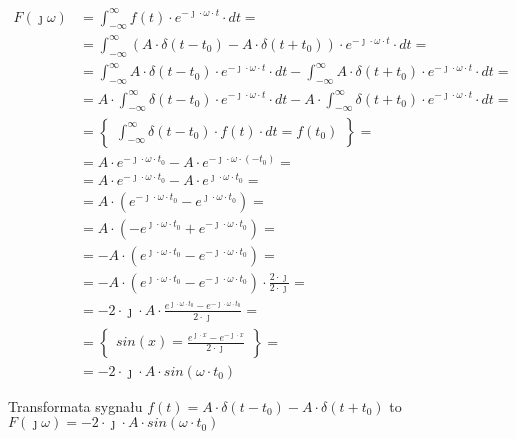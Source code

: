 \begin{task}
\begin{align*}
F(\jmath \omega )&=\int_{-\infty }^{\infty}f(t) \cdot e^{-\jmath \cdot \omega \cdot t}\cdot dt=\\
&=\int_{-\infty }^{\infty} \left( A \cdot \delta(t-t_0) - A \cdot \delta(t+t_0) \right)\cdot e^{-\jmath \cdot \omega \cdot t} \cdot dt=\\
&=\int_{-\infty }^{\infty} A \cdot \delta(t-t_0) \cdot e^{-\jmath \cdot \omega \cdot t} \cdot dt - \int_{-\infty }^{\infty} A \cdot \delta(t+t_0) \cdot e^{-\jmath \cdot \omega \cdot t} \cdot dt=\\
&= A \cdot \int_{-\infty }^{\infty} \delta(t-t_0) \cdot e^{-\jmath \cdot \omega \cdot t} \cdot dt -  A \cdot \int_{-\infty }^{\infty} \delta(t+t_0) \cdot e^{-\jmath \cdot \omega \cdot t} \cdot dt=\\
&=\begin{Bmatrix}
\int_{-\infty }^{\infty} \delta(t-t_0) \cdot f(t) \cdot dt = f(t_0)
\end{Bmatrix}=\\
&= A \cdot e^{-\jmath \cdot \omega \cdot t_0} -  A \cdot e^{-\jmath \cdot \omega \cdot (-t_0)}=\\
&= A \cdot e^{-\jmath \cdot \omega \cdot t_0} -  A \cdot e^{\jmath \cdot \omega \cdot t_0}=\\
&= A \cdot \left(e^{-\jmath \cdot \omega \cdot t_0} -  e^{\jmath \cdot \omega \cdot t_0}\right)=\\
&= A \cdot \left(-  e^{\jmath \cdot \omega \cdot t_0} +  e^{-\jmath \cdot \omega \cdot t_0}\right)=\\
&= -A \cdot \left(e^{\jmath \cdot \omega \cdot t_0} -  e^{-\jmath \cdot \omega \cdot t_0}\right)=\\
&= -A \cdot \left(e^{\jmath \cdot \omega \cdot t_0} -  e^{-\jmath \cdot \omega \cdot t_0}\right)\cdot \frac{2\cdot \jmath}{2\cdot \jmath}=\\
&= -2 \cdot \jmath \cdot A \cdot \frac{e^{\jmath \cdot \omega \cdot t_0} -  e^{-\jmath \cdot \omega \cdot t_0}}{2\cdot \jmath}=\\
&=\begin{Bmatrix}
sin(x) = \frac{e^{\jmath \cdot x} - e^{-\jmath \cdot x}}{2\cdot \jmath}
\end{Bmatrix}=\\
&= -2 \cdot \jmath \cdot A \cdot sin(\omega \cdot t_0)
\end{align*}

Transformata sygnału $f(t)=A \cdot \delta(t-t_0) - A \cdot \delta(t+t_0)$ to $F(\jmath \omega)=-2 \cdot \jmath \cdot A \cdot sin(\omega \cdot t_0)$



\end{task}
